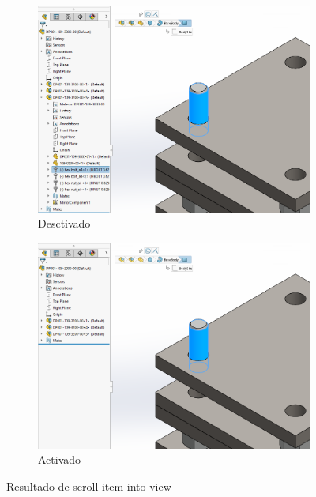 \documentclass{report}
\begin{document}
\begin{figure}[H]
	\centering
	\begin{subfigure}[b]{0.45\textwidth}
		\includegraphics[width=\textwidth]{Imagenes/solidworks_macro_09}
		\caption{Desctivado}
		\label{fig:solidworksmacro09}
	\end{subfigure}
	\begin{subfigure}[b]{0.45\textwidth}
		\includegraphics[width=\textwidth]{Imagenes/solidworks_macro_10}
		\caption{Activado}
		\label{fig:solidworksmacro10}
	\end{subfigure}
	\caption{Resultado de scroll item into view}
\end{figure}
\end{document}
